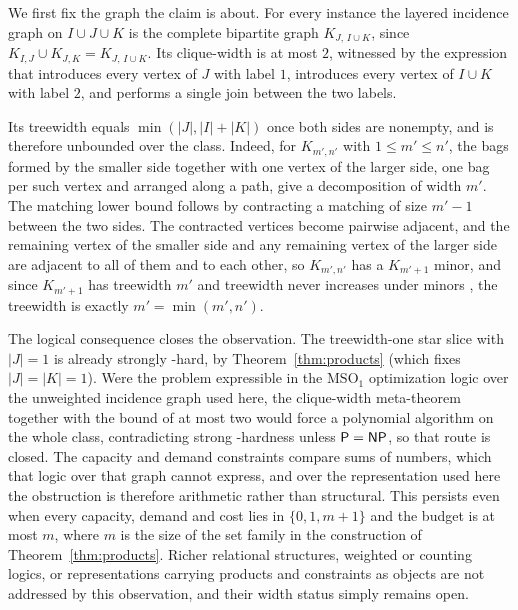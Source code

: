 \begin{observation}\label{obs:cliquewidth}
We first fix the graph the claim is about.
For every instance the layered incidence graph on $I\cup J\cup K$ is the
complete bipartite graph $K_{J,\,I\cup K}$, since
$K_{I,J}\cup K_{J,K}=K_{J,\,I\cup K}$. Its clique-width is at most $2$,
witnessed by the expression that introduces every vertex of $J$ with
label $1$, introduces every vertex of $I\cup K$ with label $2$, and
performs a single join between the two labels.

Its treewidth
\citep{RobertsonSeymour1986} equals
$\min(|J|,|I|+|K|)$ once both sides are nonempty, and is therefore
unbounded over the class. Indeed, for $K_{m',n'}$ with
$1\le m'\le n'$, the bags formed by the smaller side together with one
vertex of the larger side, one bag per such vertex and arranged along a
path, give a decomposition of width $m'$. The matching lower bound
follows by contracting a matching of size $m'-1$ between the two sides.
The contracted
vertices become pairwise adjacent, and the remaining vertex of the
smaller side and any remaining vertex of the larger side are adjacent to
all of them and to each other, so $K_{m',n'}$ has a $K_{m'+1}$ minor,
and since $K_{m'+1}$ has treewidth $m'$ and treewidth never increases
under minors \citep{RobertsonSeymour1986}, the treewidth is exactly
$m'=\min(m',n')$.

The logical consequence closes the observation.
The treewidth-one star slice with $|J|=1$ is already strongly
\NP-hard, by Theorem~\ref{thm:products} (which fixes $|J|=|K|=1$). Were
the problem expressible in the
$\mathrm{MSO}_1$ optimization logic over the unweighted incidence graph
used here, the clique-width meta-theorem
\citep{CourcelleMakowskyRotics2000} together with the bound of at most
two would force a polynomial algorithm on the whole class,
contradicting strong \NP-hardness unless $\textsf{P}=\textsf{NP}$, so that route is
closed. The capacity and demand constraints compare sums of numbers,
which that logic over that graph cannot express, and over the
representation used here the obstruction is therefore arithmetic rather
than structural. This persists even when every capacity, demand and
cost lies in $\{0,1,m+1\}$ and the budget is at most $m$, where $m$ is
the size of the set family in the construction of
Theorem~\ref{thm:products}. Richer relational structures, weighted or
counting logics, or representations carrying products and constraints
as objects are not addressed by this observation, and their width
status simply remains open.
\end{observation}
